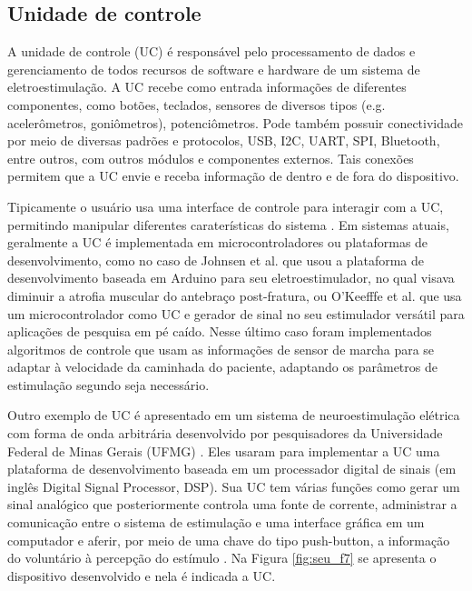 \subsection{Unidade de controle}

A unidade de controle (\acrshort{UC}) é responsável pelo processamento de dados e gerenciamento de todos recursos de software e hardware de um sistema de eletroestimulação. A \acrshort{UC} recebe como entrada informações de diferentes componentes, como botões, teclados, sensores de diversos tipos (e.g. acelerômetros, goniômetros), potenciômetros. Pode também possuir conectividade por meio de diversas padrões e protocolos, \acrshort{USB}, \acrshort{I2C}, \acrshort{UART}, \acrshort{SPI}, Bluetooth, entre outros, com outros módulos e componentes externos. Tais conexões permitem que a \acrshort{UC} envie e receba informação de dentro e de fora do dispositivo. 

Tipicamente o usuário usa uma interface de controle para interagir com a \acrshort{UC}, permitindo manipular diferentes caraterísticas do sistema \cite{Souza2012EstagioFuncional, Wu2002AApplications, Popovic2004CompexApplications, Masdar2012DevelopmentInjuries}. Em sistemas atuais, geralmente a \acrshort{UC} é implementada em microcontroladores ou plataformas de desenvolvimento, como no caso de Johnsen et al. \cite{Johnsen2011DesignPost-fracture} que usou a plataforma de desenvolvimento baseada em Arduino para seu eletroestimulador, no qual visava diminuir a atrofia muscular do antebraço post-fratura, ou O’Keefffe et al. \cite{OKeeffe2002AApplications} que usa um microcontrolador como \acrshort{UC} e gerador de sinal no seu estimulador versátil para aplicações de pesquisa em pé caído. Nesse último caso foram implementados algoritmos de controle que usam as informações de sensor de marcha para se adaptar à velocidade da caminhada do paciente, adaptando os parâmetros de estimulação segundo seja necessário.

Outro exemplo de \acrshort{UC} é apresentado em um sistema de neuroestimulação elétrica com forma de onda arbitrária desenvolvido por pesquisadores da Universidade Federal de Minas Gerais (\acrshort{UFMG}) \cite{Martins2008DeselvolvimentoArbitraria}. Eles usaram para implementar a \acrshort{UC} uma plataforma de desenvolvimento baseada em um processador digital de sinais (em inglês Digital Signal Processor, \acrshort{DSP}). Sua \acrshort{UC} tem várias funções como gerar um sinal analógico que posteriormente controla uma fonte de corrente, administrar a comunicação entre o sistema de estimulação e uma interface gráfica em um computador e aferir, por meio de uma chave do tipo push-button, a informação do voluntário à percepção do estímulo \cite{Martins2008DeselvolvimentoArbitraria}. Na Figura \ref{fig:seu_f7} se apresenta o dispositivo desenvolvido e nela é indicada a \acrshort{UC}.

